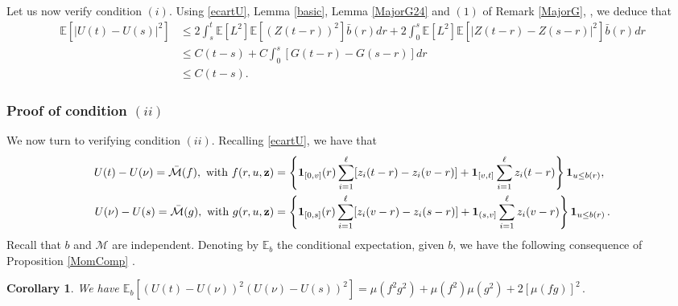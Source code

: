 \documentclass[11pt]{article}
\def\E{{\mathbb E}}
\def\z {\mathbf{z}}
\newtheorem{corollary}[theorem]{Corollary}
\begin{document}
Let us now verify condition $(i)$. Using \eqref{ecartU}, Lemma \ref{basic}, Lemma \ref{MajorG24} and $(1)$ of Remark \ref{MajorG}, , we deduce that 
\begin{align}
\E[|U(t)-U(s)|^2]& \le 2 \int_s^t \E[L^2]\E[(Z(t-r))^2] \bar{b}(r)dr
+ 2\int_0^s \E[L^2]\E[|Z(t-r)-Z(s-r)|^2]\bar{b}(r)dr \label{estimU2}\\
&\le C(t-s)+C\int_0^s[G(t-r)-G(s-r)]dr\nonumber\\
&\le C(t-s). \nonumber
\end{align}

\subsubsection{Proof of condition $(ii)$}
We now turn to verifying condition $(ii)$. 
Recalling \eqref{ecartU}, we have that
\begin{align*}
U(t)-U(\nu)=\bar{\mathcal{M}}(f),\ \text{with }
f(r,u,\z)&=\left\{{\bf1}_{[0,v]}(r)\sum_{i=1}^\ell[z_i(t-r)-z_i(v-r)]+{\bf1}_{[v,t]}\sum_{i=1}^\ell z_i(t-r)\right\}{\bf1}_{u\le b(r)},\\
U(\nu)-U(s)=\bar{\mathcal{M}}(g),\ \text{with }
g(r,u,\z)&=\left\{{\bf1}_{[0,s]}(r)\sum_{i=1}^\ell[z_i(v-r)-z_i(s-r)]+{\bf1}_{(s,v]}\sum_{i=1}^\ell z_i(v-r)\right\}{\bf1}_{u\le b(r)}\,.
\end{align*}
Recall that $b$ and $\mathcal{M}$ are independent. 
Denoting by $\E_b$ the conditional expectation, given $b$, we have the following consequence of Proposition \ref{MomComp} . 
\begin{corollary}\label{moncondi}
We have $\E_b \left[(U(t)-U(\nu))^2(U(\nu)-U(s))^2 \right]=\mu(f^2g^2)+\mu(f^2)\mu(g^2)+2[\mu(fg)]^2\,.$
\end{corollary}
\end{document}
